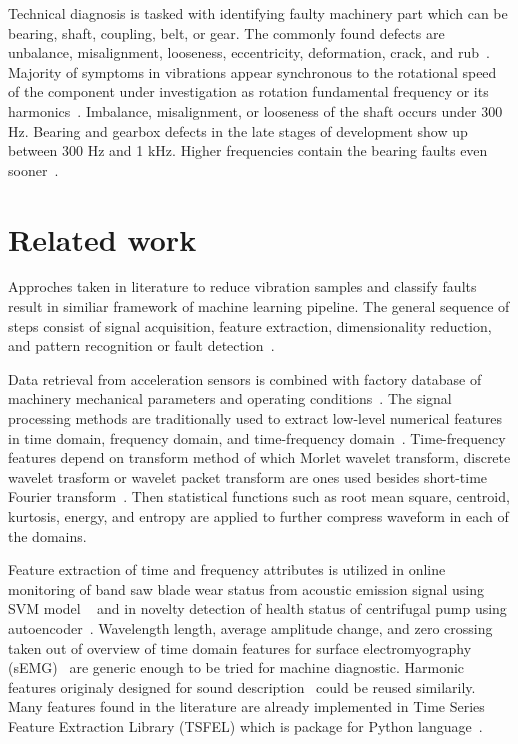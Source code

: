 \documentclass{llncs}
\begin{document}
Technical diagnosis is tasked with identifying faulty machinery part which can be bearing, shaft, coupling, belt, or gear. The commonly found defects are unbalance, misalignment, looseness, eccentricity, deformation, crack, and rub~\cite{mohanty_machinery_2015, scheffer_practical_2004}. Majority of symptoms in vibrations appear synchronous to the rotational speed of the component under investigation as rotation fundamental frequency or its harmonics~\cite{davies_handbook_2012}. Imbalance, misalignment, or looseness of the shaft occurs under 300 Hz. Bearing and gearbox defects in the late stages of development show up between 300 Hz and 1 kHz. Higher frequencies contain the bearing faults even sooner~\cite{torres_automatic_2022}.  


\section{Related work}
Approches taken in literature to reduce vibration samples and classify faults result in similiar framework of machine learning pipeline. The general sequence of steps consist of signal acquisition, feature extraction, dimensionality reduction, and pattern recognition or fault detection~\cite{wang_bearing_2015, brito_fault_2021}. 

Data retrieval from acceleration sensors is combined with factory database of machinery mechanical parameters and operating conditions~\cite{jung_vibration_2017}. The signal processing methods are traditionally used to extract low-level numerical features in time domain, frequency domain, and time-frequency domain~\cite{nandi_condition_2019}. Time-frequency features depend on transform method of which Morlet wavelet transform, discrete wavelet trasform or wavelet packet transform are ones used besides short-time Fourier transform~\cite{maurya_condition-based_2021}. Then statistical functions such as root mean square, centroid, kurtosis, energy, and entropy are applied to further compress
waveform in each of the domains. 

Feature extraction of time and frequency attributes is utilized in online monitoring of band saw blade wear status from acoustic emission signal using SVM model ~\cite{zhuo_research_2022} and in novelty detection of health status of centrifugal pump using autoencoder~\cite{mostafavi_novel_2021}. Wavelength length, average amplitude change, and zero crossing taken out of overview of time domain features for surface electromyography (sEMG)~\cite{moctar_time-domain_2023} are generic enough to be tried for machine diagnostic. Harmonic features originaly designed for sound description~\cite{peeters_large_2004} could be reused similarily. Many features found in the literature are already implemented in Time Series Feature Extraction Library (TSFEL) which is package for Python language~\cite{tsfel}. 
\end{document}
